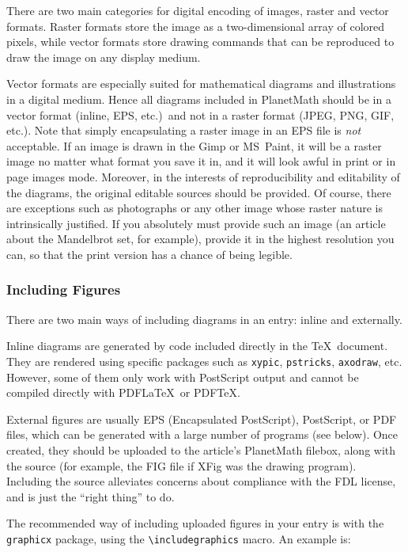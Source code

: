 There are two main categories for digital encoding of images, raster
and vector formats. Raster formats store the image as a two-dimensional
array of colored pixels, while vector formats store drawing commands
that can be reproduced to draw the image on any display medium.

Vector formats are especially suited for mathematical diagrams and
illustrations in a digital medium. Hence all diagrams included in
PlanetMath should be in a vector format (inline, EPS, etc.)\ and not
in a raster format (JPEG, PNG, GIF, etc.). Note that simply
encapsulating a raster image in an EPS file is \emph{not} acceptable.
If an image is drawn in the Gimp or MS~Paint\texttrademark,
it will be a raster image no matter what format you save it in, and it will
look awful in print or in page images mode.
Moreover, in the interests of reproducibility and editability of
the diagrams, the original editable sources should be provided. Of
course, there are exceptions such as photographs or any other image
whose raster nature is intrinsically justified.
If you absolutely must provide such an image (an article about the Mandelbrot
set, for example), provide it in the highest resolution you can, so that the
print version has a chance of being legible.

\subsubsection{Including Figures}
There are two main ways of including diagrams in an entry: inline and
externally.

Inline diagrams are generated by code included directly in the \TeX\
document. They are rendered using specific packages such as
\texttt{xypic}, \texttt{pstricks}, \texttt{axodraw}, etc. However,
some of them only work with PostScript output and cannot be compiled
directly with PDF\LaTeX\ or PDF\TeX.

External figures are usually EPS (Encapsulated PostScript), PostScript, or PDF files, which can be generated with a large number of programs (see below). Once created, they should be uploaded to the article's PlanetMath filebox, along with the source (for example, the FIG file if XFig was the drawing program). Including the source alleviates concerns about compliance with the FDL license, and is just the ``right thing'' to do.

The recommended way of including uploaded figures in your entry is with the
\texttt{graphicx} package, using the \verb|\includegraphics| macro.
An example is:

